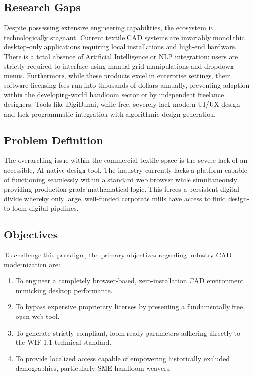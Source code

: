 \subsection{Research Gaps}
Despite possessing extensive engineering capabilities, the ecosystem is technologically stagnant. Current textile CAD systems are invariably monolithic desktop-only applications requiring local installations and high-end hardware. There is a total absence of Artificial Intelligence or NLP integration; users are strictly required to interface using manual grid manipulations and dropdown menus. Furthermore, while these products excel in enterprise settings, their software licensing fees run into thousands of dollars annually, preventing adoption within the developing-world handloom sector or by independent freelance designers. Tools like DigiBunai, while free, severely lack modern UI/UX design and lack programmatic integration with algorithmic design generation.

\subsection{Problem Definition}
The overarching issue within the commercial textile space is the severe lack of an accessible, AI-native design tool. The industry currently lacks a platform capable of functioning seamlessly within a standard web browser while simultaneously providing production-grade mathematical logic. This forces a persistent digital divide whereby only large, well-funded corporate mills have access to fluid design-to-loom digital pipelines. 

\subsection{Objectives}
To challenge this paradigm, the primary objectives regarding industry CAD modernization are:
\begin{enumerate}
    \item To engineer a completely browser-based, zero-installation CAD environment mimicking desktop performance.
    \item To bypass expensive proprietary licenses by presenting a fundamentally free, open-web tool.
    \item To generate strictly compliant, loom-ready parameters adhering directly to the WIF 1.1 technical standard.
    \item To provide localized access capable of empowering historically excluded demographics, particularly SME handloom weavers.
\end{enumerate}

